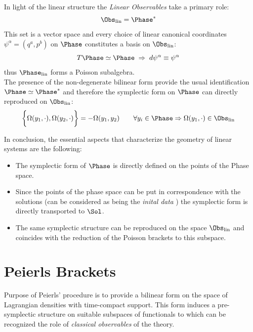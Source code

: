 \documentclass[Main]{subfiles}
\begin{document}
	In light of the linear structure the \emph{Linear Observables} take a primary role:
	\begin{displaymath}
		\Obs_{\textrm{lin}} = \Phase^*
	\end{displaymath}
	This set is a vector space and every choice of linear canonical coordinates $\psi^\alpha = (q^a, p^b)$ on $\Phase$ constitutes a  basis on $\Obs_{\textrm{lin}} $:
	\begin{displaymath}
		T\Phase \simeq \Phase \; \Rightarrow \; d\psi^\alpha \equiv \psi^\alpha
	\end{displaymath}
	thus $\Phase_{\textrm{lin}}$ forms a Poisson subalgebra.
	\\%
	The presence of the non-degenerate bilinear form provide the usual identification $\Phase \simeq \Phase^*$ and therefore the symplectic form on $\Phase$ can directly reproduced on $\Obs_{\textrm{lin}} $:
	\begin{displaymath}
		\biggr\{ \Omega(y_1, \cdot),\Omega(y_2, \cdot)\biggr\} = - \Omega(y_1, y_2) \qquad \forall y_i \in \Phase \Rightarrow \Omega(y_1, \cdot) \in \Obs_\textrm{lin}
	\end{displaymath}

	
	
	
			In conclusion, the essential aspects that characterize the geometry of linear systems are the following:
		\begin{itemize}
			\item The symplectic form of $\Phase$ is directly defined on the points of the Phase space.
			\item Since the points of the phase space can be put in correspondence with the solutions (can be considered as being  the \emph{inital data} ) the symplectic form is directly transported to $\Sol$.
			\item The same symplectic structure can be reproduced on the space $\Obs_\textrm{lin}$ and coincides with the reduction of the Poisson brackets to this subspace.
			\end{itemize}


	\section{Peierls Brackets}\label{Section:PeierlsBrackets}
		Purpose of Peierls' procedure is to provide a bilinear form on the space of Lagrangian densities with time-compact support.
		This form induces a pre-symplectic structure on suitable subspaces of functionals to which can be recognized the role of \emph{classical observables}  of the theory.	
\end{document}
